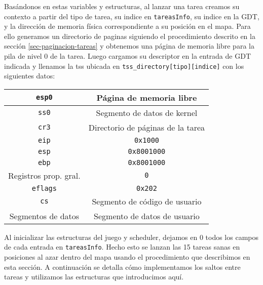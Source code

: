\label{subsec:tss-lanzar}
Basándonos en estas variables y estructuras, al lanzar una tarea creamos su contexto a partir del tipo de tarea, su indice en \verb|tareasInfo|, su indice en la GDT, y la dirección de memoria física correspondiente a su posición en el mapa. 
Para ello generamos un directorio de paginas siguiendo el procedimiento descrito en la sección \ref{sec-paginacion-tareas} y obtenemos una página de memoria libre para la pila de nivel 0 de la tarea. Luego cargamos su descriptor en la entrada de GDT indicada y llenamos la tss ubicada en \verb|tss_directory[tipo][indice]| con los siguientes datos:\\


\begin{center}
	\begin{tabular}{ |c| c | }
		\hline
		\verb|esp0| & Página de memoria libre\\
		\hline
		\verb|ss0|  & Segmento de datos de kernel\\
		\hline
		\verb|cr3|  & Directorio de páginas de la tarea\\
		\hline
		\verb|eip|  & \verb|0x1000|\\
		\hline
		\verb|esp|  & \verb|0x8001000|\\
		\hline
		\verb|ebp|  & \verb|0x8001000|\\
		\hline
		Registros prop. gral. & \verb|0|\\
		\hline
		\verb|eflags| & \verb|0x202|\\
		\hline
		\verb|cs| & Segmento de código de usuario\\
		\hline
		Segmentos de datos & Segmento de datos de usuario\\
		\hline
	\end{tabular}
\end{center}
\vspace{10pt}

\label{sec:tss-tareasInfo-init}
Al inicializar las estructuras del juego y scheduler, dejamos en 0 todos los campos de cada entrada en \verb|tareasInfo|. Hecho esto se lanzan las 15 tareas sanas en posiciones al azar dentro del mapa usando el procedimiento que describimos en esta sección. A continuación se detalla cómo implementamos los saltos entre tareas y utilizamos las estructuras que introducimos aquí.






